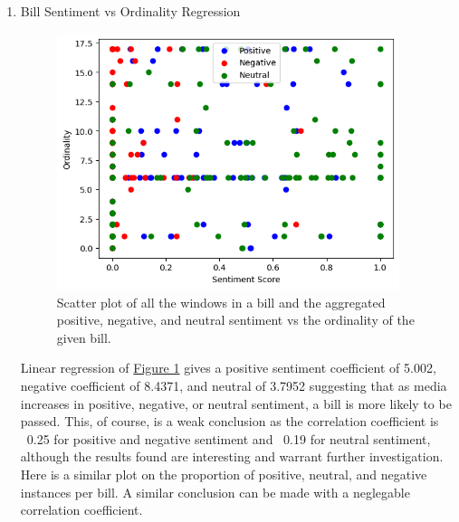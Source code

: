 \documentclass[letterpaper,11pt]{article}
\begin{document}
    \begin{enumerate}
        \item Bill Sentiment vs Ordinality Regression
        \begin{center}
            \begin{figure}[htbp!]
                \centering
                \includegraphics[width=10cm]{figs/fig_11.png}
                \captionsetup{ margin=2cm}
                    \caption{Scatter plot of all the windows in a bill and the aggregated positive, negative, and neutral sentiment vs the ordinality of the given bill.}
                \label{fig:scatterplot}
                \end{figure}
        \end{center}
    \vspace{-.74cm} %
    Linear regression of \href{fig:scatterplot}{Figure 1} gives a positive sentiment coefficient of 5.002, negative coefficient of 8.4371, and neutral of 3.7952 suggesting that as media increases in positive, negative, or neutral sentiment, a bill is more likely to be passed. This, of course, is a weak conclusion as the correlation coefficient is ~0.25 for positive and negative sentiment and ~0.19 for neutral sentiment, although the results found are interesting and warrant further investigation. \\

    Here is a similar plot on the proportion of positive, neutral, and negative instances per bill. A similar conclusion can be made with a neglegable correlation coefficient. 


\end{enumerate}
\end{document}
